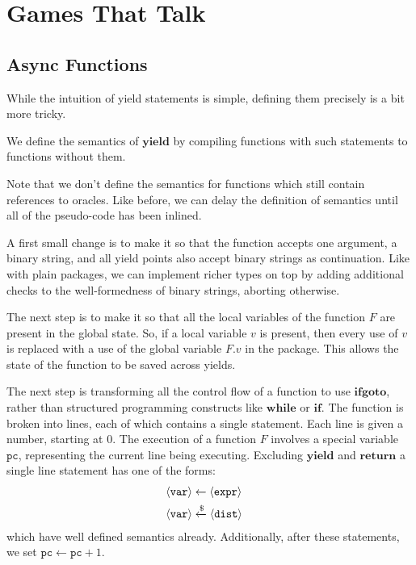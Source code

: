 \section{Games That Talk}

\subsection{Async Functions}

While the intuition of yield statements is simple, defining
them precisely is a bit more tricky.

\begin{definition}
We define the semantics of $\textbf{yield}$ by compiling functions with
such statements to functions without them.

Note that we don't define the semantics for functions which still contain references
to oracles.
Like before, we can delay the definition of semantics until all of the
pseudo-code has been inlined.

A first small change is to make it so that the function accepts one
argument, a binary string, and all yield points also accept binary
strings as continuation.
Like with plain packages, we can implement richer types on top by adding
additional checks to the well-formedness of binary strings, aborting
otherwise.

The next step is to make it so that all the local variables of the function $F$
are present in the global state.
So, if a local variable $v$ is present, then every use
of $v$ is replaced with a use of the global variable $F.v$ in the package.
This allows the state of the function to be saved across yields.

The next step is transforming all the control flow of a function to
use $\textbf{ifgoto}$, rather than structured programming constructs like
$\textbf{while}$ or $\textbf{if}$.
The function is broken into lines, each of which contains a single statement.
Each line is given a number, starting at $0$.
The execution of a function $F$ involves a special variable $\texttt{pc}$,
representing the current line being executing.
Excluding $\textbf{yield}$ and $\textbf{return}$ a single line statement has one of the
forms:
$$
\begin{aligned}
&\langle \texttt{var} \rangle \gets \langle \texttt{expr} \rangle\cr
&\langle \texttt{var} \rangle \xleftarrow{\$} \langle \texttt{dist} \rangle\cr
\end{aligned}
$$
which have well defined semantics already.
Additionally, after these statements, we set $\texttt{pc} \gets \texttt{pc} + 1$.


\end{definition}
